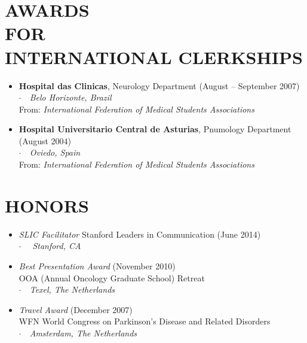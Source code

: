 \documentclass[line,margin]{res}
\newcommand{\placestyle}[1]{\footnotesize $\cdot$\ \ {\emph{#1}}}
\newcommand{\datestyle}[1]{{\tiny \dotfill} {\small (#1)}}
\begin{document}
\begin{resume}
\section{AWARDS \\ FOR \\ INTERNATIONAL CLERKSHIPS}
\begin{itemize}
\item {\bf Hospital das Clinicas}, Neurology Department \datestyle{August -- September 2007} \\
  { \placestyle{Belo Horizonte, Brazil} } \\
  { \small From: \emph{International Federation of Medical Students Associations} }
\item {\bf Hospital Universitario Central de Asturias}, Pnumology Department \datestyle{August 2004} \\
  { \placestyle{Oviedo, Spain} } \\
  { \small From: \emph{International Federation of Medical Students Associations} }
\end{itemize}

\section{HONORS}
\begin{itemize}
\item \emph{SLIC Facilitator} Stanford Leaders in Communication \datestyle{June 2014} \\
  { \placestyle{ Stanford, CA } }
\item \emph{Best Presentation Award} \datestyle{November 2010} \\
    {OOA (Annual Oncology Graduate School) Retreat} \\
    { \placestyle{Texel, The Netherlands} }
\item \emph{Travel Award} \datestyle{December 2007} \\
    {WFN World Congress on Parkinson's Disease and Related Disorders}  \\
    { \placestyle{Amsterdam, The Netherlands} }
\end{itemize}


\end{resume}
\end{document}

